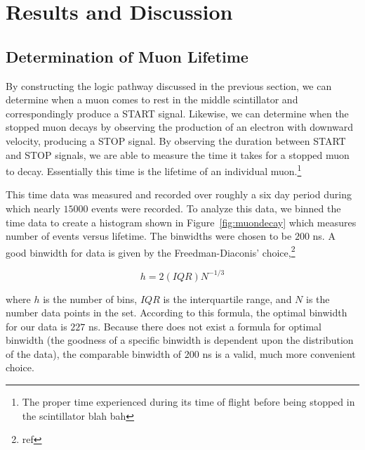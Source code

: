 
\section{Results and Discussion}\label{resultsanddiscussion}

\subsection{Determination of Muon Lifetime}\label{determinationofmuonlifetime}

By constructing the logic pathway discussed in the previous section,
we can determine when a muon comes to rest in the middle scintillator
and correspondingly produce a START signal. Likewise, we can determine when the stopped muon decays by observing
the production of an electron with downward velocity, producing a STOP signal.  By observing the
duration between START and STOP signals, we are able to measure
the time it takes for a stopped muon to decay.  Essentially this time
is the lifetime of an individual muon.\footnote{The proper time
experienced during its time of flight before being stopped in the
scintillator blah bah}

This time data was measured and recorded over roughly a six day period
during which nearly $15000$ events were recorded.  To analyze this
data, we binned the time data to create a histogram shown in Figure~\ref{fig:muondecay} which measures number of events versus lifetime.
The binwidths were chosen to be $200$ ns. A good binwidth for data is given by the Freedman-Diaconis' choice,\footnote{ref}

\begin{equation}
\label{eq:binwidth}
h=2(IQR)N^{-1/3}
\end{equation}

where $h$ is the number of bins, $IQR$ is the interquartile range, and $N$ is the number data points in the set.  According to this formula, the optimal binwidth for our data is $227$ ns.  Because there does not exist a formula for optimal binwidth (the goodness of a specific binwidth is dependent upon the distribution of the data), the comparable binwidth of $200$ ns is a valid, much more convenient choice. 



